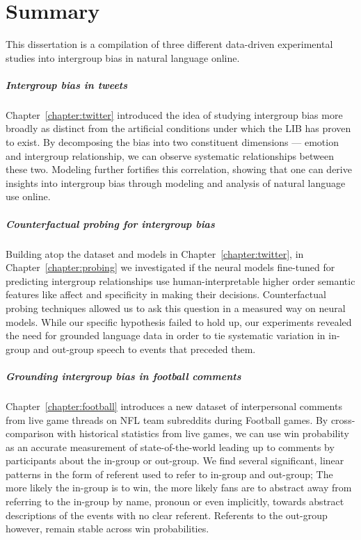 \chapter{Summary}
\label{chapter:summary}

This dissertation is a compilation of three different data-driven experimental studies into intergroup bias in natural language online.

\paragraph{Intergroup bias in tweets} Chapter~\ref{chapter:twitter} introduced the idea of studying intergroup bias more broadly as distinct from the artificial conditions under which the LIB has proven to exist. By decomposing the bias into two constituent dimensions --- emotion and intergroup relationship, we can observe systematic relationships between these two. Modeling further fortifies this correlation, showing that one can derive insights into intergroup bias through modeling and analysis of natural language use online.

\paragraph{Counterfactual probing for intergroup bias} Building atop the dataset and models in Chapter~\ref{chapter:twitter}, in Chapter~\ref{chapter:probing} we investigated if the neural models fine-tuned for predicting intergroup relationships use human-interpretable higher order semantic features like affect and specificity in making their decisions. Counterfactual probing techniques allowed us to ask this question in a measured way on neural models. While our specific hypothesis failed to hold up, our experiments revealed the need for grounded language data in order to tie systematic variation in in-group and out-group speech to events that preceded them.

\paragraph{Grounding intergroup bias in football comments} Chapter~\ref{chapter:football} introduces a new dataset of interpersonal comments from live game threads on NFL team subreddits during Football games. By cross-comparison with historical statistics from live games, we can use win probability as an accurate measurement of state-of-the-world leading up to comments by participants about the in-group or out-group. We find several significant, linear patterns in the form of referent used to refer to in-group and out-group; The more likely the in-group is to win, the more likely fans are to abstract away from referring to the in-group by name, pronoun or even implicitly, towards abstract descriptions of the events with no clear referent. Referents to the out-group however, remain stable across win probabilities. 

